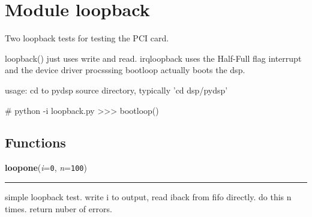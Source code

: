 %
%
%


\section{Module loopback}

    \label{loopback}
Two loopback tests for testing the PCI card.

loopback() just uses write and read. irqloopback uses the Half-Full flag 
interrupt and the device driver procsssing bootloop actually boots the dsp.

usage: cd to pydsp source directory, typically 'cd dsp/pydsp'

\# python -i loopback.py {\textgreater}{\textgreater}{\textgreater} 
bootloop()



  \subsection{Functions}

    \label{loopback:loopone}

    \vspace{0.5ex}

    \begin{boxedminipage}{\textwidth}

    \raggedright \textbf{loopone}(\textit{i}=\texttt{0}, \textit{n}=\texttt{100})

    \vspace{-1.5ex}

    \rule{\textwidth}{0.5\fboxrule}
    simple loopback test. write i to output, read iback from fifo directly.
    do this n times. return nuber of errors.

    \vspace{1ex}

    \end{boxedminipage}

